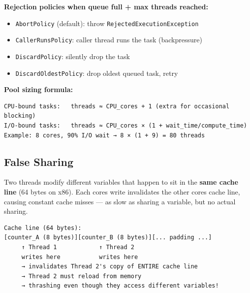\documentclass[11pt]{article}
\providecommand{\tightlist}{\setlength{\itemsep}{1pt}\setlength{\parskip}{0pt}}
\begin{document}
\textbf{Rejection policies when queue full + max threads reached:}

\begin{itemize}
\tightlist
\item
  \texttt{AbortPolicy} (default): throw \texttt{RejectedExecutionException}
\item
  \texttt{CallerRunsPolicy}: caller thread runs the task (backpressure)
\item
  \texttt{DiscardPolicy}: silently drop the task
\item
  \texttt{DiscardOldestPolicy}: drop oldest queued task, retry
\end{itemize}

\textbf{Pool sizing formula:}

\setcodelang{}

\begin{verbatim}
CPU-bound tasks:   threads ≈ CPU_cores + 1 (extra for occasional blocking)
I/O-bound tasks:   threads ≈ CPU_cores × (1 + wait_time/compute_time)
Example: 8 cores, 90% I/O wait → 8 × (1 + 9) = 80 threads
\end{verbatim}

\subsection{False Sharing}\label{false-sharing}

Two threads modify different variables that happen to sit in the \textbf{same cache line} (64 bytes on x86). Each core\textquotesingle s write invalidates the other core\textquotesingle s cache line, causing constant cache misses --- as slow as sharing a variable, but no actual sharing.

\setcodelang{}

\begin{verbatim}
Cache line (64 bytes):
[counter_A (8 bytes)][counter_B (8 bytes)][... padding ...]
     ↑ Thread 1            ↑ Thread 2
     writes here           writes here
     → invalidates Thread 2's copy of ENTIRE cache line
     → Thread 2 must reload from memory
     → thrashing even though they access different variables!
\end{verbatim}

\end{document}
